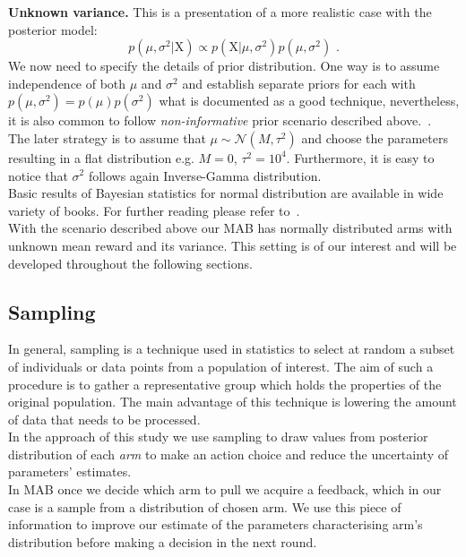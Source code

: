 \documentclass[12pt, a4paper, pdflatex, leqno, twoside]{report}
\begin{document}
\textbf{\textrm{Unknown variance. }}This is a presentation of a more realistic case with the 
posterior model:
$$
p \left(  \mu, \sigma^2 | \mathrm{X} \right) \propto p \left( \mathrm{X} | \mu, 
\sigma^2 \right)    p \left( \mu, \sigma^2 \right) \text{ .}
$$
We now need to specify the details of prior distribution. One way is to assume 
independence of both $\mu$ and $\sigma^2$ and establish separate priors for 
each with $p(\mu, \sigma^2) = p(\mu) p(\sigma^2)$ what is documented as a good 
technique, nevertheless, it is also common to follow \emph{non-informative} prior 
scenario described above.~\citep{gelman2003bayesian}.\\
The later strategy is to assume that $\mu \sim 
\mathcal{N} \left( M, \tau^2 \right)$ and choose the parameters resulting in a 
flat distribution e.g. $M=0$, $\tau^2 = 10^4$. Furthermore, it is easy to notice 
that $\sigma^2$ follows again \textrm{Inverse}-\textrm{Gamma} distribution.\\

\noindent Basic results of Bayesian statistics for normal distribution are 
available in wide variety of books. For further reading please refer 
to~\citep{lynch2007introduction, gelman2003bayesian}.\\

With the scenario described above our MAB has normally distributed arms with unknown mean reward and its variance. This setting is of our interest and will be developed throughout the following sections.\\
\subsection{Sampling}
In general, sampling is a technique used in statistics to select at random a 
subset of individuals or data points from a population of interest. The aim of 
such a procedure is to gather a representative group which holds the properties of 
the original population. The main advantage of this technique is lowering the 
amount of data that needs to be processed.\\
In the approach of this study
we use sampling to draw values from posterior distribution of 
each \emph{arm} to make an action choice and reduce the uncertainty of parameters' 
estimates.\\

In MAB once we decide which arm to pull we acquire a feedback, which in our case is a sample from a distribution of chosen arm. We use this piece of information to improve our estimate of the parameters characterising arm's distribution before making a decision in the next round.\\
\end{document}
